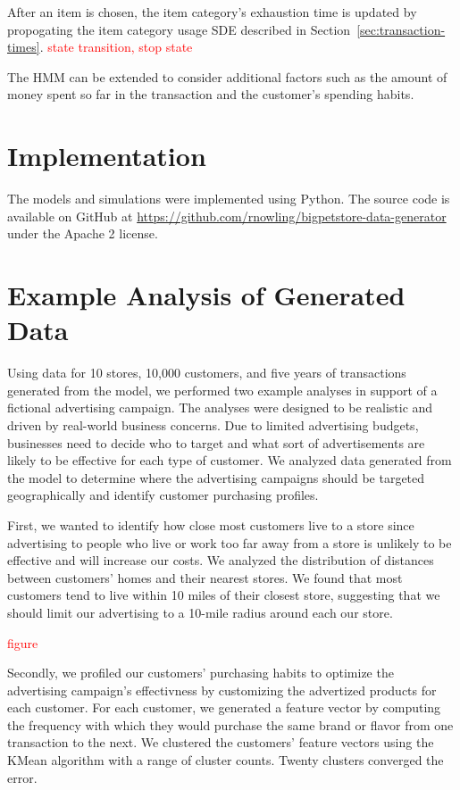 \documentclass[conference]{IEEEtran}
\begin{document}
After an item is chosen, the item category's exhaustion time is updated by propogating the item category usage SDE described in Section~\ref{sec:transaction-times}. \textcolor{red}{state transition, stop state}

The HMM can be extended to consider additional factors such as the amount of money spent so far in the transaction and the customer's spending habits.

\section{Implementation}
The models and simulations were implemented using Python. The source code is available on GitHub \cite{GitHub} at \url{https://github.com/rnowling/bigpetstore-data-generator} under the Apache 2 license.

\section{Example Analysis of Generated Data}
Using data for 10 stores, 10,000 customers, and five years of transactions generated from the model, we performed two example analyses in support of a fictional advertising campaign. The analyses were designed to be realistic and driven by real-world business concerns.  Due to limited advertising budgets, businesses need to decide who to target and what sort of advertisements are likely to be effective for each type of customer.  We analyzed data generated from the model to determine where the advertising campaigns should be targeted geographically and identify customer purchasing profiles.

First, we wanted to identify how close most customers live to a store since advertising to people who live or work too far away from a store is unlikely to be effective and will increase our costs. We analyzed the distribution of distances between customers' homes and their nearest stores.  We found that most customers tend to live within 10 miles of their closest store, suggesting that we should limit our advertising to a 10-mile radius around each our store.

\textcolor{red}{figure}

Secondly, we profiled our customers' purchasing habits to optimize the advertising campaign's effectivness by customizing the advertized products for each customer.  For each customer, we generated a feature vector by computing the frequency with which they would purchase the same brand or flavor from one transaction to the next.  We clustered the customers' feature vectors using the KMean algorithm with a range of cluster counts. Twenty clusters converged the error.
\end{document}
